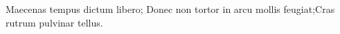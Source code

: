 \acresetall
\noindent Maecenas tempus dictum libero; Donec non tortor in arcu mollis feugiat;Cras rutrum pulvinar tellus.